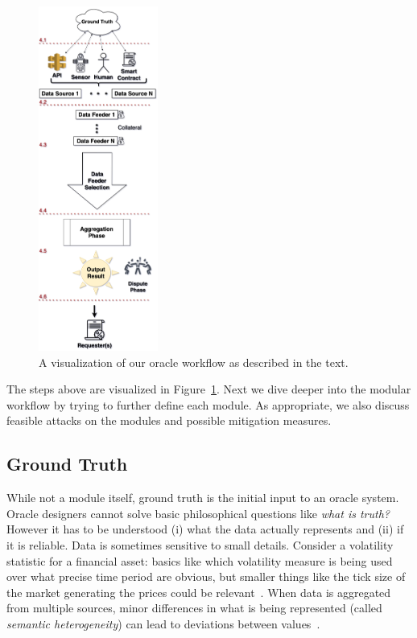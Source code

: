 \begin{figure}[t!]
    \centering
    \includegraphics[width=0.35\textwidth]{figures/data_flow_vertical.png}
    \caption[Modular Framework for Oracles]{A visualization of our oracle workflow as described in the text.}
    \label{fig:dataflow}
\end{figure}	
	
	
	
The steps above are visualized in Figure~\ref{fig:dataflow}. Next we dive deeper into the modular workflow by trying to further define each module. As appropriate, we also discuss feasible attacks on the modules and possible mitigation measures.


\subsection{Ground Truth}\label{ground_truth} 

While not a module itself, ground truth is the initial input to an oracle system. Oracle designers cannot solve basic philosophical questions like \textit{what is truth?} However it has to be understood (i) what the data actually represents and (ii) if it is reliable. Data is sometimes sensitive to small details. Consider a volatility statistic for a financial asset: basics like which volatility measure is being used over what precise time period are obvious, but smaller things like the tick size of the market generating the prices could be relevant~\cite{firat2002knowledge}. When data is aggregated from multiple sources, minor differences in what is being represented (called \emph{semantic heterogeneity}) can lead to deviations between values~\cite{madnick2006improving,worboys1991semantic,hakimpour2001resolving}.

